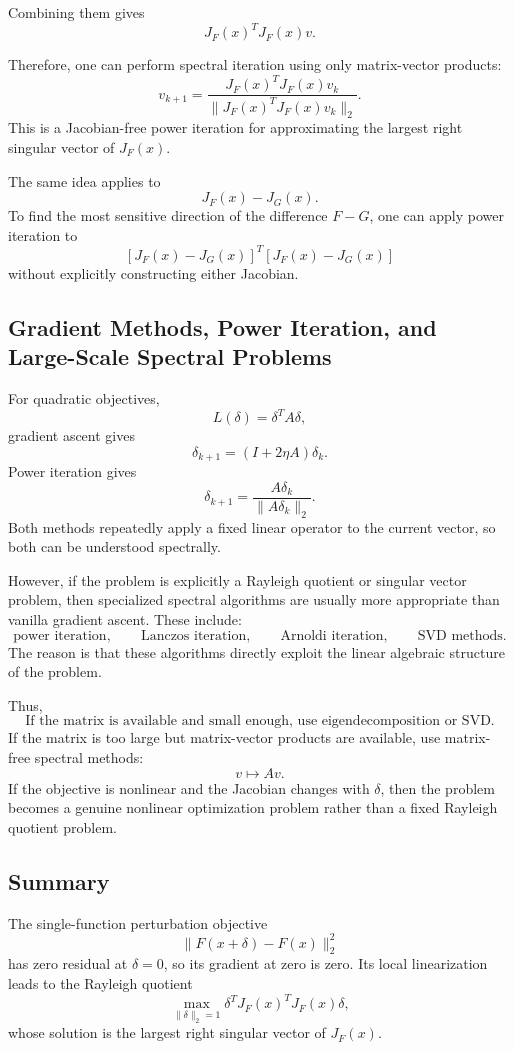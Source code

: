 \documentclass{article}
\begin{document}
Combining them gives
\[
J_F(x)^TJ_F(x)v.
\]

Therefore, one can perform spectral iteration using only matrix-vector products:
\[
v_{k+1}
=
\frac{J_F(x)^TJ_F(x)v_k}
{\|J_F(x)^TJ_F(x)v_k\|_2}.
\]
This is a Jacobian-free power iteration for approximating the largest right singular vector of \(J_F(x)\).

The same idea applies to
\[
J_F(x)-J_G(x).
\]
To find the most sensitive direction of the difference \(F-G\), one can apply power iteration to
\[
\left[J_F(x)-J_G(x)\right]^T
\left[J_F(x)-J_G(x)\right]
\]
without explicitly constructing either Jacobian.

\subsection{Gradient Methods, Power Iteration, and Large-Scale Spectral Problems}

For quadratic objectives,
\[
L(\delta)=\delta^TA\delta,
\]
gradient ascent gives
\[
\delta_{k+1}=(I+2\eta A)\delta_k.
\]
Power iteration gives
\[
\delta_{k+1}=\frac{A\delta_k}{\|A\delta_k\|_2}.
\]
Both methods repeatedly apply a fixed linear operator to the current vector, so both can be understood spectrally.

However, if the problem is explicitly a Rayleigh quotient or singular vector problem, then specialized spectral algorithms are usually more appropriate than vanilla gradient ascent. These include:
\[
\text{power iteration},
\qquad
\text{Lanczos iteration},
\qquad
\text{Arnoldi iteration},
\qquad
\text{SVD methods}.
\]
The reason is that these algorithms directly exploit the linear algebraic structure of the problem.

Thus,
\[
\boxed{
\text{If the matrix is available and small enough, use eigendecomposition or SVD.}
}
\]
If the matrix is too large but matrix-vector products are available, use matrix-free spectral methods:
\[
\boxed{
v\mapsto Av.
}
\]
If the objective is nonlinear and the Jacobian changes with \(\delta\), then the problem becomes a genuine nonlinear optimization problem rather than a fixed Rayleigh quotient problem.

\subsection{Summary}

The single-function perturbation objective
\[
\|F(x+\delta)-F(x)\|_2^2
\]
has zero residual at \(\delta=0\), so its gradient at zero is zero. Its local linearization leads to the Rayleigh quotient
\[
\max_{\|\delta\|_2=1}
\delta^T J_F(x)^T J_F(x)\delta,
\]
whose solution is the largest right singular vector of \(J_F(x)\).
\end{document}
